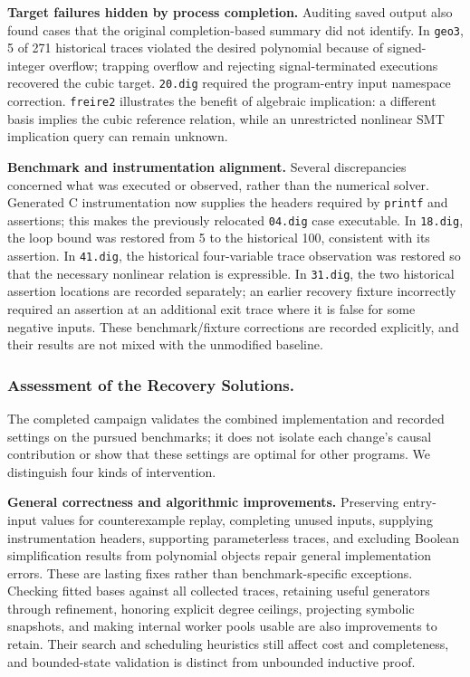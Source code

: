 \documentclass[runningheads]{llncs}
\newcommand{\code}[1]{\texttt{\small #1}}
\begin{document}
\medskip\noindent\textbf{Target failures hidden by process completion.}
Auditing saved output also found cases that the original completion-based summary did not identify.  In \code{geo3}, 5 of 271 historical traces violated the desired polynomial because of signed-integer overflow; trapping overflow and rejecting signal-terminated executions recovered the cubic target.  \code{20.dig} required the program-entry input namespace correction.  \code{freire2} illustrates the benefit of algebraic implication: a different basis implies the cubic reference relation, while an unrestricted nonlinear SMT implication query can remain unknown.

\medskip\noindent\textbf{Benchmark and instrumentation alignment.}
Several discrepancies concerned what was executed or observed, rather than the numerical solver.  Generated C instrumentation now supplies the headers required by \code{printf} and assertions; this makes the previously relocated \code{04.dig} case executable.  In \code{18.dig}, the loop bound was restored from 5 to the historical 100, consistent with its assertion.  In \code{41.dig}, the historical four-variable trace observation was restored so that the necessary nonlinear relation is expressible.  In \code{31.dig}, the two historical assertion locations are recorded separately; an earlier recovery fixture incorrectly required an assertion at an additional exit trace where it is false for some negative inputs.  These benchmark/fixture corrections are recorded explicitly, and their results are not mixed with the unmodified baseline.

\subsubsection{Assessment of the Recovery Solutions.}
The completed campaign validates the combined implementation and recorded settings on the pursued benchmarks; it does not isolate each change's causal contribution or show that these settings are optimal for other programs.  We distinguish four kinds of intervention.

\medskip\noindent\textbf{General correctness and algorithmic improvements.}
Preserving entry-input values for counterexample replay, completing unused inputs, supplying instrumentation headers, supporting parameterless traces, and excluding Boolean simplification results from polynomial objects repair general implementation errors.  These are lasting fixes rather than benchmark-specific exceptions.  Checking fitted bases against all collected traces, retaining useful generators through refinement, honoring explicit degree ceilings, projecting symbolic snapshots, and making internal worker pools usable are also improvements to retain.  Their search and scheduling heuristics still affect cost and completeness, and bounded-state validation is distinct from unbounded inductive proof.
\end{document}
